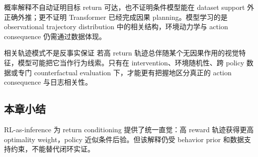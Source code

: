 概率解释不自动证明目标 return 可达，也不证明条件模型能在 dataset support 外正确外推；更不证明 Transformer 已经完成因果 planning。模型学习的是 observational trajectory distribution 中的相关结构，环境动力学与 action consequence 仍需通过数据体现。

\begin{warningbox}{相关轨迹模式不是反事实保证}
若高 return 轨迹总伴随某个无因果作用的视觉特征，模型可能把它当作行为线索。只有在 intervention、环境随机性、跨 policy 数据或专门 counterfactual evaluation 下，才能更有把握地区分真正的 action consequence 与日志相关性。
\end{warningbox}

\subsection{本章小结}

RL-as-inference 为 return conditioning 提供了统一直觉：高 reward 轨迹获得更高 optimality weight，policy 近似条件后验。但该解释仍受 behavior prior 和数据支持约束，不能替代闭环实证。

